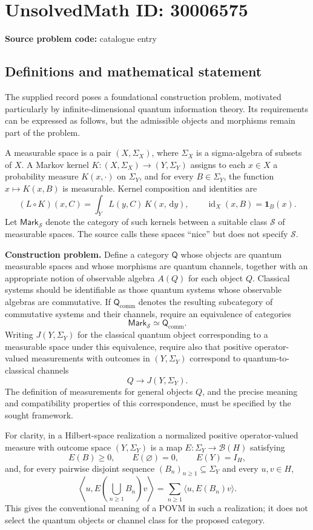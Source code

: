 \documentclass[11pt]{article}
\newcommand{\dd}{\,\mathrm{d}}
\begin{document}
\section*{UnsolvedMath ID: 30006575}
\textbf{Source problem code:} catalogue entry
\subsection{Definitions and mathematical statement}
The supplied record poses a foundational construction problem, motivated particularly by infinite-dimensional quantum information theory. Its requirements can be expressed as follows, but the admissible objects and morphisms remain part of the problem.

A measurable space is a pair \((X,\Sigma_X)\), where \(\Sigma_X\) is a sigma-algebra of subsets of \(X\). A Markov kernel \(K:(X,\Sigma_X)\to(Y,\Sigma_Y)\) assigns to each \(x\in X\) a probability measure \(K(x,\cdot)\) on \(\Sigma_Y\), and for every \(B\in\Sigma_Y\), the function \(x\mapsto K(x,B)\) is measurable. Kernel composition and identities are
\[
 (L\circ K)(x,C)=\int_Y L(y,C)\,K(x,\dd y),
 \qquad \operatorname{id}_X(x,B)=\mathbf{1}_B(x).
\]
Let \(\mathsf{Mark}_{\mathcal S}\) denote the category of such kernels between a suitable class \(\mathcal S\) of measurable spaces. The source calls these spaces ``nice'' but does not specify \(\mathcal S\).

\textbf{Construction problem.} Define a category \(\mathsf Q\) whose objects are quantum measurable spaces and whose morphisms are quantum channels, together with an appropriate notion of observable algebra \(A(Q)\) for each object \(Q\). Classical systems should be identifiable as those quantum systems whose observable algebras are commutative. If \(\mathsf Q_{\mathrm{comm}}\) denotes the resulting subcategory of commutative systems and their channels, require an equivalence of categories
\[
 \mathsf{Mark}_{\mathcal S}\simeq\mathsf Q_{\mathrm{comm}}.
\]
Writing \(J(Y,\Sigma_Y)\) for the classical quantum object corresponding to a measurable space under this equivalence, require also that positive operator-valued measurements with outcomes in \((Y,\Sigma_Y)\) correspond to quantum-to-classical channels
\[
 Q\longrightarrow J(Y,\Sigma_Y).
\]
The definition of measurements for general objects \(Q\), and the precise meaning and compatibility properties of this correspondence, must be specified by the sought framework.

For clarity, in a Hilbert-space realization a normalized positive operator-valued measure with outcome space \((Y,\Sigma_Y)\) is a map \(E:\Sigma_Y\to\mathcal B(H)\) satisfying
\[
 E(B)\geq 0,\qquad E(\varnothing)=0,\qquad E(Y)=I_H,
\]
and, for every pairwise disjoint sequence \((B_n)_{n\geq1}\subseteq\Sigma_Y\) and every \(u,v\in H\),
\[
 \left\langle u,E\!\left(\bigcup_{n\geq1}B_n\right)v\right\rangle
 =\sum_{n\geq1}\langle u,E(B_n)v\rangle.
\]
This gives the conventional meaning of a POVM in such a realization; it does not select the quantum objects or channel class for the proposed category.
\end{document}
